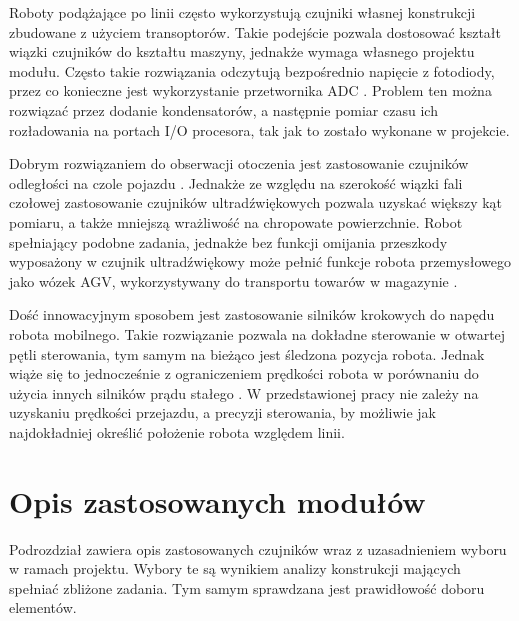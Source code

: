 Roboty podążające po linii często wykorzystują czujniki własnej konstrukcji zbudowane z użyciem transoptorów. Takie podejście pozwala dostosować kształt wiązki czujników do kształtu maszyny, jednakże wymaga własnego projektu modułu. Często takie rozwiązania odczytują bezpośrednio napięcie z fotodiody, przez co konieczne jest wykorzystanie przetwornika ADC \cite{line_czujnik}. Problem ten można rozwiązać przez dodanie kondensatorów, a następnie pomiar czasu ich rozładowania na portach I/O procesora, tak jak to zostało wykonane w projekcie. 

Dobrym rozwiązaniem do obserwacji otoczenia jest zastosowanie czujników odległości na czole pojazdu  \cite{line_sharp}. Jednakże ze względu na szerokość wiązki fali czołowej zastosowanie czujników ultradźwiękowych pozwala uzyskać większy kąt pomiaru, a także mniejszą wrażliwość na chropowate powierzchnie. Robot spełniający podobne zadania, jednakże bez funkcji omijania przeszkody wyposażony w czujnik ultradźwiękowy może pełnić funkcje robota przemysłowego jako wózek AGV, wykorzystywany do transportu towarów w magazynie \cite{AGV}.

Dość innowacyjnym sposobem jest zastosowanie silników krokowych do napędu robota mobilnego. Takie rozwiązanie pozwala na dokładne sterowanie w otwartej pętli sterowania, tym samym na bieżąco jest śledzona pozycja robota.\cite{kurosz} Jednak wiąże się to jednocześnie z ograniczeniem prędkości robota w porównaniu do użycia innych silników prądu stałego \cite{Tadeo}. W przedstawionej pracy nie zależy na uzyskaniu prędkości przejazdu, a precyzji sterowania, by możliwie jak najdokładniej określić położenie robota względem linii.

\section{Opis zastosowanych modułów}
Podrozdział zawiera opis zastosowanych czujników wraz z uzasadnieniem wyboru w ramach projektu. Wybory te są wynikiem analizy konstrukcji mających spełniać zbliżone zadania. Tym samym sprawdzana jest prawidłowość doboru elementów.
